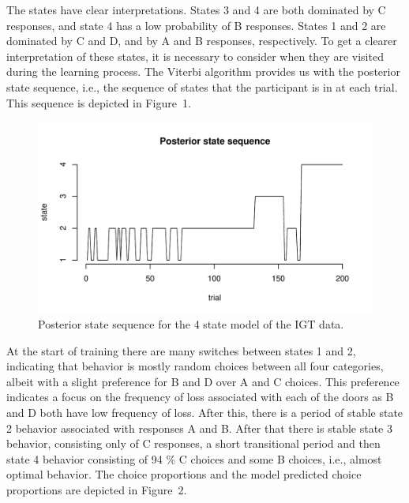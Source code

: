 \documentclass[a4paper,12pt,man]{apa} %
\newcommand{\citep}{\cite}
\begin{document}
The states have clear interpretations.  States 3 and 4 are both
dominated by C responses, and state 4 has a low probability of B
responses.  States 1 and 2 are dominated by C and D, and by A and B
responses, respectively.  To get a clearer interpretation of these
states, it is necessary to consider when they are visited during the
learning process.  The Viterbi algorithm \citep{Rabiner1989} provides
us with the posterior state sequence, i.e., the sequence of states
that the participant is in at each trial.  This sequence is depicted
in Figure~1.


\begin{figure}
\begin{center}
	\includegraphics[width=\textwidth]{graphs/post4.pdf}
	\caption{Posterior state sequence for the 4 state model of the IGT 
	data.}
	\label{fig:post4}
\end{center}
\end{figure}

At the start of training there are many switches between states 1 and
2, indicating that behavior is mostly random choices between all four
categories, albeit with a slight preference for B and D over A and C
choices.  This preference indicates a focus on the frequency of loss
associated with each of the doors as B and D both have low frequency
of loss.  After this, there is a period of stable state 2 behavior
associated with responses A and B. After that there is stable state 3
behavior, consisting only of C responses, a short transitional period
and then state 4 behavior consisting of 94 \% C choices and some B
choices, i.e., almost optimal behavior.  The choice proportions and
the model predicted choice proportions are depicted in Figure~2.
\end{document}
